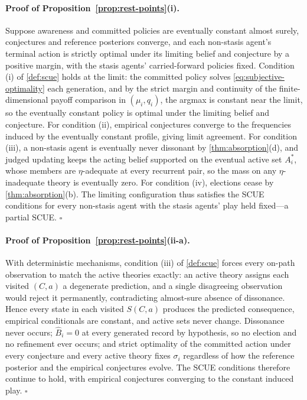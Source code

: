 \documentclass[11pt]{article}
\theoremstyle{definition}
\begin{document}
\paragraph{Proof of Proposition~\ref{prop:rest-points}(i).}
Suppose awareness and committed policies are eventually constant almost
surely, conjectures and reference posteriors converge, and each non-stasis
agent's terminal action is strictly optimal under its limiting belief and
conjecture by a positive margin, with the stasis agents' carried-forward
policies fixed.  Condition (i) of \cref{def:scue} holds at the limit: the
committed policy solves \cref{eq:subjective-optimality} each generation, and by
the strict margin and continuity of the finite-dimensional payoff comparison
in $(\mu_i,q_i)$, the argmax is constant near the limit, so the eventually
constant policy is optimal under the limiting belief and conjecture.  For
condition (ii), empirical conjectures converge to the frequencies induced by
the eventually constant profile, giving limit agreement.  For condition (iii),
a non-stasis agent is eventually never dissonant by \cref{thm:absorption}(d),
and judged updating keeps the acting belief supported on the eventual active
set $A_i^{*}$, whose members are $\eta$-adequate at every recurrent pair, so
the mass on any $\eta$-inadequate theory is eventually zero.  For condition
(iv), elections cease by \cref{thm:absorption}(b).  The limiting configuration
thus satisfies the SCUE conditions for every non-stasis agent with the stasis
agents' play held fixed---a partial SCUE.  \hfill$\square$

\paragraph{Proof of Proposition~\ref{prop:rest-points}(ii-a).}
With deterministic mechanisms, condition (iii) of \cref{def:scue} forces
every on-path observation to match the active theories exactly: an active
theory assigns each visited $(C,a)$ a degenerate prediction, and a single
disagreeing observation would reject it permanently, contradicting
almost-sure absence of dissonance.  Hence every state in each visited
$S(C,a)$ produces the predicted consequence, empirical conditionals are
constant, and active sets never change.  Dissonance never occurs;
$\widehat B_i=0$ at every generated record by hypothesis, so no election and
no refinement ever occurs; and strict optimality of the committed action under
every conjecture and every active theory fixes $\sigma_i$ regardless of how
the reference posterior and the empirical conjectures evolve.  The SCUE
conditions therefore continue to hold, with empirical conjectures converging
to the constant induced play.  \hfill$\square$
\end{document}
